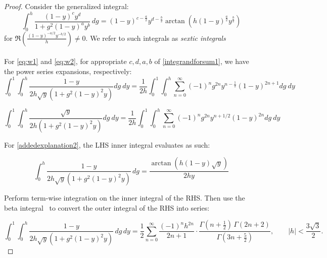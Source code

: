 \documentclass[12pt]{article}
\begin{document}
\begin{proof}
 
Consider the generalized integral: 
\begin{equation}\label{integrandforsum1}
 \int_{0}^{h} \frac{(1 - y)^c y^d}{1 + g^2 (1 - y)^a y^b} \, dg = (1 - y)^{c - \frac{a}{2}} y^{d - \frac{b}{2}} 
 \operatorname{arctan}\left( h (1 - y)^{\frac{a}{2}} y^{\frac{b}{2}} \right) 
 \end{equation}
 for $\Re\left( \frac{ \left( 1 - y \right)^{-a/2} y^{-b/2} }{h} \right) \neq 0$. We refer to such integrals as \emph{sextic integrals}
 \\
 \\
For \eqref{eq:w1} and \eqref{eq:w2}, for appropriate $c,d,a,b$ of \eqref{integrandforsum1}, we have the power series expansions, respectively: 
   \begin{equation}\label{addedexplanation2}
  \int_{0}^{1}  \int_{0}^{h} \frac{1-y}{2 h \sqrt{y} \left(1 + g^2 (1-y)^2 y \right)} dg\ dy
 = \frac{1}{2h }  \int_{0}^{1}  \int_{0}^{h}  \sum_{n=0}^{\infty} (-1)^{n} g^{2n} y^{n - \frac{1}{2}} (1-y)^{2n+1}  dg\ dy 
\end{equation}




 \begin{equation}\label{addedexplanation2b}
  \int_{0}^{1}  \int_{0}^{h} \frac{\sqrt{y}}{2 h  \left(1 + g^2 (1-y)^2 y \right)} dg\ dy
 = \frac{1}{2h }  \int_{0}^{1}  \int_{0}^{h}  \sum_{n=0}^{\infty} (-1)^{n} g^{2n} y^{n+1/2 } (1-y)^{2n}  dg\ dy 
\end{equation}



\noindent For \eqref{addedexplanation2}, the LHS inner integral evaluates as such:

\begin{equation}\label{addedexplanation1}
 \int_{0}^{h} 
 \frac{1-y}{2 h \sqrt{y} \left(1 + g^2 (1-y)^2 y \right)} \, dg =\frac{ \operatorname{arctan}\left( h (1 - y) \sqrt{y} \right) }{2 h y} 
\end{equation}

\noindent Perform term-wise integration on the inner integral of the RHS. Then use the beta integral \dag \ to convert the outer integral of the RHS into series:

\begin{equation}
\int_{0}^{1}\int_{0}^{h} \frac{1-y}{2h\sqrt{y}\left(1+g^2(1-y)^2 y\right)}\,dg\,dy 
= \frac{1}{2}\sum_{n=0}^{\infty} \frac{(-1)^{n} h^{2n}}{2n+1}
\cdot\frac{\Gamma\!\left(n+\frac{1}{2}\right)\,\Gamma(2n+2)}{\Gamma\!\left(3n+\frac{5}{2}\right)},
\qquad |h| < \frac{3\sqrt{3}}{2}.
\end{equation}


\end{proof}
\end{document}

